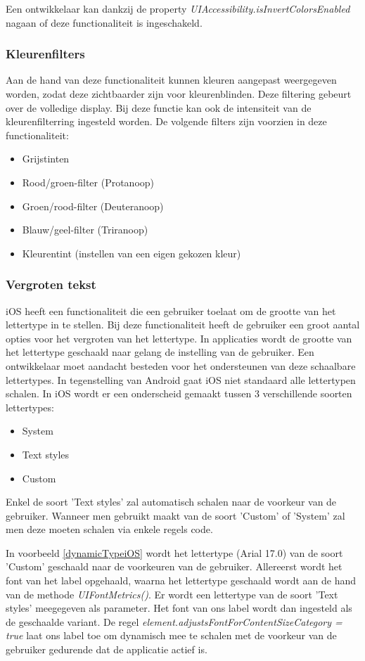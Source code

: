 Een ontwikkelaar kan dankzij de property \emph{UIAccessibility.isInvertColorsEnabled} nagaan of deze functionaliteit is ingeschakeld. 
\subsubsection{Kleurenfilters}
Aan de hand van deze functionaliteit kunnen kleuren aangepast weergegeven worden, zodat deze zichtbaarder zijn voor kleurenblinden. Deze filtering gebeurt over de volledige display. Bij deze functie kan ook de intensiteit van de kleurenfilterring ingesteld worden. De volgende filters zijn voorzien in deze functionaliteit: \begin{itemize}
    \item Grijstinten
    \item Rood/groen-filter (Protanoop)
    \item Groen/rood-filter (Deuteranoop)
    \item Blauw/geel-filter (Triranoop)
        \item Kleurentint (instellen van een eigen gekozen kleur)
\end{itemize}
\subsubsection{Vergroten tekst}
\label{subsec:iOSSchalenTekst}
iOS heeft een functionaliteit die een gebruiker toelaat om de grootte van het lettertype in te stellen. Bij deze functionaliteit heeft de gebruiker een groot aantal opties voor het vergroten van het lettertype. In applicaties wordt de grootte van het lettertype geschaald naar gelang de instelling van de gebruiker. Een ontwikkelaar moet aandacht besteden voor het ondersteunen van deze schaalbare lettertypes. In tegenstelling van Android gaat iOS niet standaard alle lettertypen schalen.
In iOS wordt er een onderscheid gemaakt tussen 3 verschillende soorten lettertypes:
\begin{itemize}
    \item System
    \item Text styles
    \item Custom
\end{itemize}
Enkel de soort 'Text styles' zal automatisch schalen naar de voorkeur van de gebruiker. Wanneer men gebruikt maakt van de soort 'Custom' of 'System' zal men deze moeten schalen via enkele regels code. 

 
In voorbeeld \ref{dynamicTypeiOS} wordt het lettertype (Arial 17.0) van de soort 'Custom' geschaald naar de voorkeuren van de gebruiker. Allereerst wordt het font van het label opgehaald, waarna het lettertype  geschaald wordt  aan de hand van de methode \emph{UIFontMetrics()}. Er wordt  een lettertype van de soort 'Text styles' meegegeven als parameter. Het font van ons label wordt dan ingesteld als de geschaalde variant. De regel \emph{element.adjustsFontForContentSizeCategory = true} laat ons label toe om dynamisch mee te schalen met de voorkeur van de gebruiker gedurende dat de applicatie actief is.

